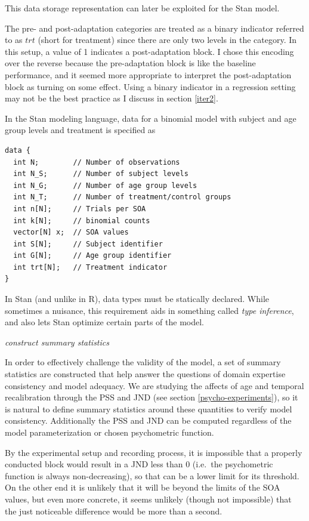 \documentclass[11pt, oneside, openany]{scrbook}
\begin{document}
This data storage representation can later be exploited for the Stan model.

The pre- and post-adaptation categories are treated as a binary indicator referred to as \(trt\) (short for treatment) since there are only two levels in the category. In this setup, a value of 1 indicates a post-adaptation block. I chose this encoding over the reverse because the pre-adaptation block is like the baseline performance, and it seemed more appropriate to interpret the post-adaptation block as turning on some effect. Using a binary indicator in a regression setting may not be the best practice as I discuss in section \ref{iter2}.

In the Stan modeling language, data for a binomial model with subject and age group levels and treatment is specified as


\begin{verbatim}
data {
  int N;        // Number of observations
  int N_S;      // Number of subject levels
  int N_G;      // Number of age group levels
  int N_T;      // Number of treatment/control groups
  int n[N];     // Trials per SOA
  int k[N];     // binomial counts
  vector[N] x;  // SOA values
  int S[N];     // Subject identifier
  int G[N];     // Age group identifier
  int trt[N];   // Treatment indicator
}
\end{verbatim}


In Stan (and unlike in R), data types must be statically declared. While sometimes a nuisance, this requirement aids in something called \emph{type inference}, and also lets Stan optimize certain parts of the model.

\emph{construct summary statistics}

In order to effectively challenge the validity of the model, a set of summary statistics are constructed that help answer the questions of domain expertise consistency and model adequacy. We are studying the affects of age and temporal recalibration through the PSS and JND (see section \ref{psycho-experiments}), so it is natural to define summary statistics around these quantities to verify model consistency. Additionally the PSS and JND can be computed regardless of the model parameterization or chosen psychometric function.

By the experimental setup and recording process, it is impossible that a properly conducted block would result in a JND less than 0 (i.e.~the psychometric function is always non-decreasing), so that can be a lower limit for its threshold. On the other end it is unlikely that it will be beyond the limits of the SOA values, but even more concrete, it seems unlikely (though not impossible) that the just noticeable difference would be more than a second.
\end{document}
